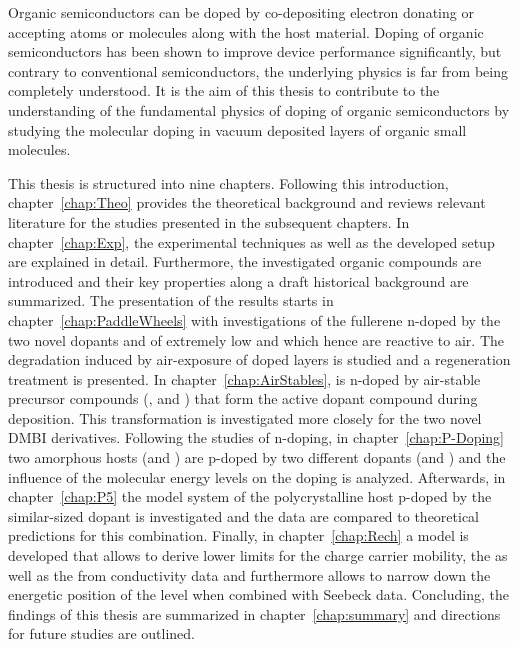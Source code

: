 Organic semiconductors can be doped by co-depositing electron donating or accepting atoms or molecules along with the host material. Doping of organic semiconductors has been shown to improve device performance significantly\cite{Walzer2007,LuessemRiedeLeo2013-PSS}, but contrary to conventional semiconductors, the underlying physics is far from being completely understood.
It is the aim of this thesis to contribute to the understanding of the fundamental physics of doping of organic semiconductors by studying the molecular doping in vacuum deposited layers of organic small molecules.

This thesis is structured into nine chapters. Following this introduction, chapter~\ref{chap:Theo} provides the theoretical background and reviews relevant literature for the studies presented in the subsequent chapters. In chapter~\ref{chap:Exp},
the experimental techniques as well as the developed setup are explained in detail. Furthermore, the investigated organic compounds are introduced and their key properties along a draft historical background are summarized.
The presentation of the results starts in chapter~\ref{chap:PaddleWheels} with investigations of the fullerene \CS n-doped by the two novel dopants \CrPd and \WPd of extremely low \IEs and which hence are reactive to air. The degradation induced by air-exposure of doped layers is studied and a regeneration treatment is presented.
In chapter~\ref{chap:AirStables}, \CS is n-doped by air-stable precursor compounds (\aob, \dmbi and \meodmbiI) that form the active dopant compound during deposition. This transformation is investigated more closely for the two novel DMBI derivatives.
Following the studies of n-doping, in chapter~\ref{chap:P-Doping} two amorphous hosts (\meo and \lili) are p-doped by two different dopants (\FS and \CSF) and the influence of the molecular energy levels on the doping is analyzed.
Afterwards, in chapter~\ref{chap:P5} the model system of the polycrystalline host \pen p-doped by the similar-sized dopant \FV is investigated and the data are compared to theoretical predictions for this combination.
Finally, in chapter~\ref{chap:Rech} a model is developed that allows to derive lower limits for the charge carrier mobility, the \nLong as well as the \DopEffLong from conductivity data and furthermore allows to narrow down the energetic position of the \EtLong level when combined with Seebeck data.
Concluding, the findings of this thesis are summarized in chapter~\ref{chap:summary} and directions for future studies are outlined.
